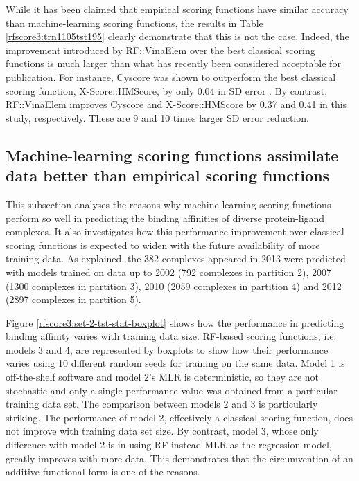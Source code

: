 While it has been claimed \citep{1372} that empirical scoring functions have similar accuracy than machine-learning scoring functions, the results in Table \ref{rfscore3:trn1105tst195} clearly demonstrate that this is not the case. Indeed, the improvement introduced by RF::VinaElem over the best classical scoring functions is much larger than what has recently been considered acceptable for publication. For instance, Cyscore was shown to outperform the best classical scoring function, X-Score::HMScore, by only 0.04 in SD error \citep{1372}. By contrast, RF::VinaElem improves Cyscore and X-Score::HMScore by 0.37 and 0.41 in this study, respectively. These are 9 and 10 times larger SD error reduction.

\subsection{Machine-learning scoring functions assimilate data better than empirical scoring functions}

This subsection analyses the reasons why machine-learning scoring functions perform so well in predicting the binding affinities of diverse protein-ligand complexes. It also investigates how this performance improvement over classical scoring functions is expected to widen with the future availability of more training data. As explained, the 382 complexes appeared in 2013 were predicted with models trained on data up to 2002 (792 complexes in partition 2), 2007 (1300 complexes in partition 3), 2010 (2059 complexes in partition 4) and 2012 (2897 complexes in partition 5). 

Figure \ref{rfscore3:set-2-tst-stat-boxplot} shows how the performance in predicting binding affinity varies with training data size. RF-based scoring functions, i.e. models 3 and 4, are represented by boxplots to show how their performance varies using 10 different random seeds for training on the same data. Model 1 is off-the-shelf software and model 2's MLR is deterministic, so they are not stochastic and only a single performance value was obtained from a particular training data set. The comparison between models 2 and 3 is particularly striking. The performance of model 2, effectively a classical scoring function, does not improve with training data set size. By contrast, model 3, whose only difference with model 2 is in using RF instead MLR as the regression model, greatly improves with more data. This demonstrates that the circumvention of an additive functional form is one of the reasons.


